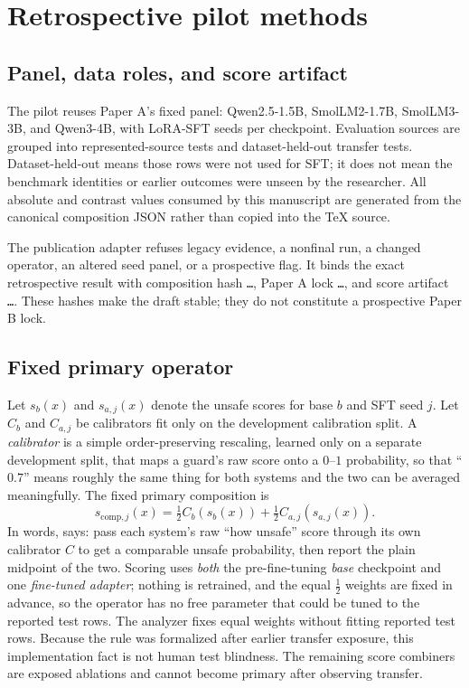 \documentclass[11pt]{article}
\begin{document}
\section{Retrospective pilot methods}
\label{sec:methods}

\subsection{Panel, data roles, and score artifact}

The pilot reuses Paper A's fixed panel: Qwen2.5-1.5B, SmolLM2-1.7B, SmolLM3-3B, and Qwen3-4B,
with \PilotNSeeds{} LoRA-SFT seeds per checkpoint.  Evaluation sources are grouped into represented-source
tests and dataset-held-out transfer tests.  Dataset-held-out means those rows were not used for
SFT; it does not mean the benchmark identities or earlier outcomes were unseen by the researcher.
All absolute and contrast values consumed by this manuscript are generated from the canonical
composition JSON rather than copied into the TeX source.

The publication adapter refuses legacy evidence, a nonfinal run, a changed operator, an altered
seed panel, or a prospective flag.  It binds the exact retrospective result with composition hash
\texttt{\PilotCompositionHashShort\ldots}, Paper A lock
\texttt{\PilotLockHashShort\ldots}, and score artifact
\texttt{\PilotScoreHashShort\ldots}.  These hashes make the draft stable; they do not constitute a
prospective Paper B lock.

\subsection{Fixed primary operator}

Let $s_b(x)$ and $s_{a,j}(x)$ denote the unsafe scores for base $b$ and SFT seed $j$.  Let
$C_b$ and $C_{a,j}$ be calibrators fit only on the development calibration split. A \emph{calibrator} is a simple order-preserving rescaling, learned only on a separate development split, that maps a guard's raw score onto a $0$--$1$ probability, so that ``$0.7$'' means roughly the same thing for both systems and the two can be averaged meaningfully.  The fixed
primary composition is
\begin{equation}
  s_{\mathrm{comp},j}(x)
  = \tfrac{1}{2} C_b(s_b(x)) + \tfrac{1}{2} C_{a,j}(s_{a,j}(x)).
  \label{eq:composition}
\end{equation}
In words,  says: pass each system's raw ``how unsafe'' score through its own calibrator $C$ to get a comparable unsafe probability, then report the plain midpoint of the two. Scoring uses \emph{both} the pre-fine-tuning \emph{base} checkpoint and one \emph{fine-tuned adapter}; nothing is retrained, and the equal $\tfrac{1}{2}$ weights are fixed in advance, so the operator has no free parameter that could be tuned to the reported test rows.
The analyzer fixes equal weights without fitting reported test rows.  Because the rule was formalized
after earlier transfer exposure, this implementation fact is not human test blindness.  The remaining
score combiners are exposed ablations and cannot become primary after observing transfer.
\end{document}
